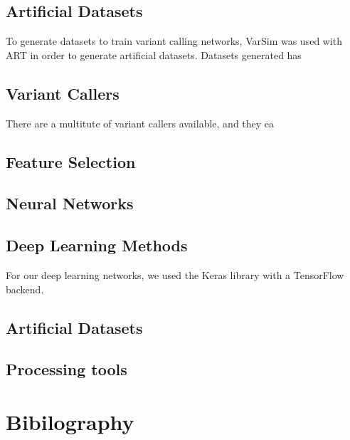 \documentclass{article}
\begin{document}
\subsection{Artificial Datasets}
To generate datasets to train variant calling networks, VarSim was used with ART in order to generate artificial datasets. Datasets generated has 


\subsection{Variant Callers}
There are a multitute of variant callers available, and they ea

\subsection{Feature Selection}

\subsection{Neural Networks}



\subsection{Deep Learning Methods}
For our deep learning networks, we used the Keras library with a TensorFlow backend. 

\subsection{Artificial Datasets}

\subsection{Processing tools}

\section{Bibilography}
\end{document}
